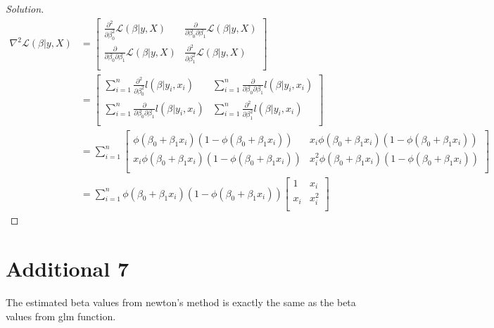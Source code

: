 \documentclass{article}
\newenvironment{solution}
  {\renewcommand\qedsymbol{$\blacksquare$}\begin{proof}[Solution]$ $}
  {\end{proof}}
\begin{document}
\begin{solution}
\begin{align*}
    \nabla^2 \mathcal L (\beta | y, X) &= \begin{bmatrix}
    \frac{\partial^2}{\partial \beta_0^2} \mathcal L(\beta | y, X) &  \frac{\partial}{\partial \beta_0 \partial \beta_1} \mathcal L(\beta | y, X) \\
    \frac{\partial}{\partial \beta_0 \partial \beta_1} \mathcal L(\beta | y, X) & \frac{\partial^2}{\partial \beta_1^2} \mathcal L(\beta | y, X) \\
    \end{bmatrix} \\
    &= \begin{bmatrix}
        \sum_{i=1}^{n} \frac{\partial^2}{\partial \beta_0^2} l(\beta | y_i, x_i) & \sum_{i=1}^{n} \frac{\partial}{\partial \beta_0 \partial \beta_1} l(\beta | y_i, x_i) \\
        \sum_{i=1}^{n} \frac{\partial}{\partial \beta_0 \partial \beta_1} l(\beta | y_i, x_i) & \sum_{i=1}^{n} \frac{\partial^2}{\partial \beta_1^2} l(\beta | y_i, x_i) \\
    \end{bmatrix} \\
    &= \sum_{i=1}^{n} \begin{bmatrix}
        \phi(\beta_0 + \beta_1 x_i)(1-\phi(\beta_0 + \beta_1 x_i)) & x_i\phi(\beta_0 + \beta_1 x_i)(1-\phi(\beta_0 + \beta_1 x_i)) \\
        x_i\phi(\beta_0 + \beta_1 x_i)(1-\phi(\beta_0 + \beta_1 x_i)) & x_i^2\phi(\beta_0 + \beta_1 x_i)(1-\phi(\beta_0 + \beta_1 x_i)) \\
    \end{bmatrix} \\
    &= \sum_{i=1}^{n} \phi(\beta_0 + \beta_1 x_i)(1-\phi(\beta_0 + \beta_1 x_i)) \begin{bmatrix}
        1 & x_i \\
        x_i & x_i^2 \\
    \end{bmatrix}
\end{align*}
\end{solution}

\section{Additional 7}
The estimated beta values from newton's method is exactly the same as the beta values from glm function. 

\inputminted{r}{multiple-logistic-regression.R}
\end{document}
